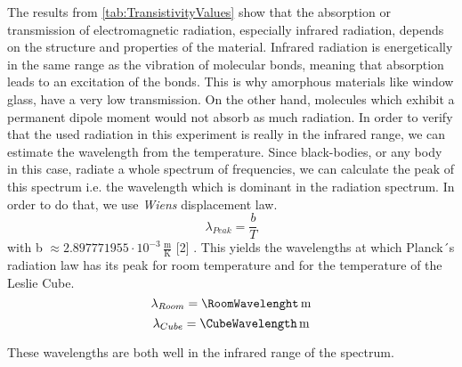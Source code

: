 \documentclass[a4paper,10pt,twocolumn]{article}
\begin{document}
    The results from \autoref{tab:TransistivityValues} show that the absorption or
    transmission of electromagnetic radiation, especially
    infrared radiation, depends on the structure and properties of the material. 
    Infrared radiation is energetically in the same range as the vibration of molecular
    bonds, meaning that absorption leads to an excitation of the bonds.
    This is why amorphous materials like window glass, have a very low transmission.
    On the other hand, molecules which exhibit a permanent dipole moment would not absorb as much radiation.
    In order to verify that the used radiation in this experiment is really in the infrared range, we can estimate the wavelength from the temperature.
    Since black-bodies, or any body in this case, radiate a whole spectrum of frequencies, we can calculate the peak of this spectrum i.e. the wavelength which is
    dominant in the radiation spectrum.
    In order to do that, we use \textit{Wiens} displacement law.
    \begin{equation}
        \lambda_{Peak} = \frac{b}{T}
    \end{equation}
    with b $\approx 2.897771955\cdot 10^{-3}\,\frac{\text{m}}{\text{K}}$ [2] .
    This yields the wavelengths at which Planck´s radiation law has its peak for room temperature and for the temperature of the Leslie Cube.
    \begin{equation}
        \lambda_{Room} = \RoomWavelenght \,\text{m}
    \end{equation}
    \begin{equation}
        \lambda_{Cube} = \CubeWavelength \,\text{m}
    \end{equation}
    
    These wavelengths are both well in the infrared range of the spectrum.
    
\end{document}
